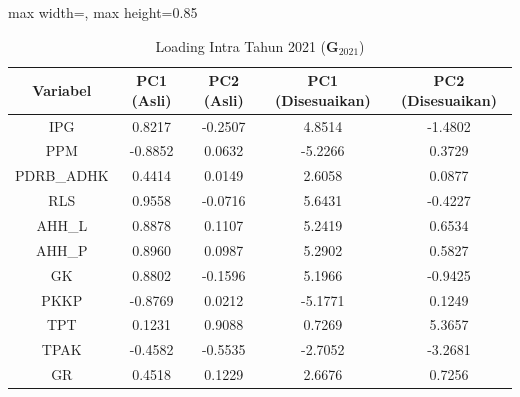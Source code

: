 \begin{table}[H]
\centering
\caption{Loading Intra Tahun 2021 ($\mathbf{G}_{2021}$)} \label{tab:apploading_intra_2021}
\begin{adjustbox}{max width=\textwidth, max height=0.85\textheight}
\begin{tabular}{|c|c|c|c|c|}
\hline
\textbf{Variabel} & \textbf{PC1 (Asli)} & \textbf{PC2 (Asli)} & \textbf{PC1 (Disesuaikan)} & \textbf{PC2 (Disesuaikan)} \\
\hline
IPG & 0.8217 & -0.2507 & 4.8514 & -1.4802 \\
PPM & -0.8852 & 0.0632 & -5.2266 & 0.3729 \\
PDRB\_ADHK & 0.4414 & 0.0149 & 2.6058 & 0.0877 \\
RLS & 0.9558 & -0.0716 & 5.6431 & -0.4227 \\
AHH\_L & 0.8878 & 0.1107 & 5.2419 & 0.6534 \\
AHH\_P & 0.8960 & 0.0987 & 5.2902 & 0.5827 \\
GK & 0.8802 & -0.1596 & 5.1966 & -0.9425 \\
PKKP & -0.8769 & 0.0212 & -5.1771 & 0.1249 \\
TPT & 0.1231 & 0.9088 & 0.7269 & 5.3657 \\
TPAK & -0.4582 & -0.5535 & -2.7052 & -3.2681 \\
GR & 0.4518 & 0.1229 & 2.6676 & 0.7256 \\
\hline
\end{tabular}
\end{adjustbox}
\end{table}